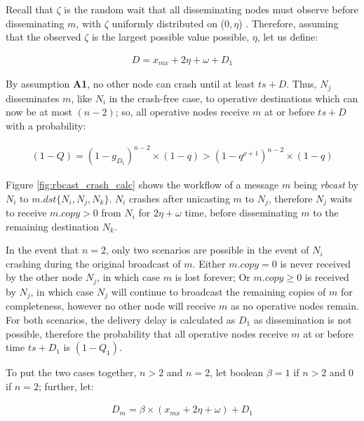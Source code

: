 Recall that $\zeta$ is the random wait that all disseminating nodes must observe before disseminating $m$, with $\zeta$ uniformly distributed on ($0, \eta$) .  Therefore, assuming that the observed $\zeta$ is the largest possible value possible, $\eta$, let us define: 

        \begin{equation*}
            \begin{aligned}
                D = x_{mx} + 2\eta + \omega + D_1
            \end{aligned}
        \end{equation*}
        
By assumption \textbf{A1}, no other node can crash until at least $ts+D$. Thus, $N_j$ disseminates $m$, like $N_i$ in the crash-free case, to operative destinations which can now be at most $(n-2)$; so, all operative nodes receive $m$ at or before $ts +D$ with a probability: 
        
        \begin{equation*}
            \begin{aligned}
                (1-Q) = (1-g_{D_1})^{n-2}\times (1-q)>(1-q^{\rho+1})^{n-2}\times(1-q)
            \end{aligned}
        \end{equation*}

Figure \ref{fig:rbcast_crash_calc} shows the workflow of a message $m$ being \emph{rbcast} by $N_i$ to $m.dst \{N_i, N_j, N_k\}$.  $N_i$ crashes after unicasting $m$ to $N_j$, therefore $N_j$ waits to receive $m.copy > 0$ from $N_i$ for $2\eta + \omega$ time, before disseminating $m$ to the remaining destination $N_k$.  

In the event that $n = 2$, only two scenarios are possible in the event of $N_i$ crashing during the original broadcast of $m$.  Either $m.copy = 0$ is never received by the other node $N_j$, in which case $m$ is lost forever; Or $m.copy \geq 0$ is received by $N_j$, in which case $N_j$ will continue to broadcast the remaining copies of $m$ for completeness, however no other node will receive $m$ as no operative nodes remain.  For both scenarios, the delivery delay is calculated as $D_1$ as dissemination is not possible, therefore the probability that all operative nodes receive $m$ at or before time $ts+D_1$ is $(1-Q_1)$.  

To put the two cases together, $n > 2$ and $n = 2$, let boolean $\beta = 1$ if $n>2$ and $0$ if $n=2$; further, let: 

        \begin{equation*}
            \begin{aligned}
                D_m=\beta\times(x_{mx}+2\eta+\omega)+D_1
            \end{aligned}
        \end{equation*}
        
